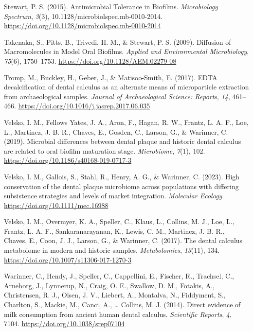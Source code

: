 \documentclass[
  letterpaper,
]{book}
\newlength{\cslhangindent}
\newlength{\cslentryspacingunit} %
\newenvironment{CSLReferences}[2] %
 {%
  \setlength{\parindent}{0pt}
  \ifodd #1
  \let\oldpar\par
  \def\par{\hangindent=\cslhangindent\oldpar}
  \fi
  \setlength{\parskip}{#2\cslentryspacingunit}
 }%
 {}
\begin{document}
\begin{CSLReferences}{1}{0}
\leavevmode{}%
Stewart, P. S. (2015). Antimicrobial {Tolerance} in {Biofilms}.
\emph{Microbiology Spectrum}, \emph{3}(3),
10.1128/microbiolspec.mb-0010-2014.
\url{https://doi.org/10.1128/microbiolspec.mb-0010-2014}

\leavevmode{}%
Takenaka, S., Pitts, B., Trivedi, H. M., \& Stewart, P. S. (2009).
Diffusion of {Macromolecules} in {Model Oral Biofilms}. \emph{Applied
and Environmental Microbiology}, \emph{75}(6), 1750--1753.
\url{https://doi.org/10.1128/AEM.02279-08}

\leavevmode{}%
Tromp, M., Buckley, H., Geber, J., \& Matisoo-Smith, E. (2017). {EDTA}
decalcification of dental calculus as an alternate means of
microparticle extraction from archaeological samples. \emph{Journal of
Archaeological Science: Reports}, \emph{14}, 461--466.
\url{https://doi.org/10.1016/j.jasrep.2017.06.035}

\leavevmode{}%
Velsko, I. M., Fellows Yates, J. A., Aron, F., Hagan, R. W., Frantz, L.
A. F., Loe, L., Martinez, J. B. R., Chaves, E., Gosden, C., Larson, G.,
\& Warinner, C. (2019). Microbial differences between dental plaque and
historic dental calculus are related to oral biofilm maturation stage.
\emph{Microbiome}, \emph{7}(1), 102.
\url{https://doi.org/10.1186/s40168-019-0717-3}

\leavevmode{}%
Velsko, I. M., Gallois, S., Stahl, R., Henry, A. G., \& Warinner, C.
(2023). High conservation of the dental plaque microbiome across
populations with differing subsistence strategies and levels of market
integration. \emph{Molecular Ecology}.
\url{https://doi.org/10.1111/mec.16988}

\leavevmode{}%
Velsko, I. M., Overmyer, K. A., Speller, C., Klaus, L., Collins, M. J.,
Loe, L., Frantz, L. A. F., Sankaranarayanan, K., Lewis, C. M., Martinez,
J. B. R., Chaves, E., Coon, J. J., Larson, G., \& Warinner, C. (2017).
The dental calculus metabolome in modern and historic samples.
\emph{Metabolomics}, \emph{13}(11), 134.
\url{https://doi.org/10.1007/s11306-017-1270-3}

\leavevmode{}%
Warinner, C., Hendy, J., Speller, C., Cappellini, E., Fischer, R.,
Trachsel, C., Arneborg, J., Lynnerup, N., Craig, O. E., Swallow, D. M.,
Fotakis, A., Christensen, R. J., Olsen, J. V., Liebert, A., Montalva,
N., Fiddyment, S., Charlton, S., Mackie, M., Canci, A., \ldots{}
Collins, M. J. (2014). Direct evidence of milk consumption from ancient
human dental calculus. \emph{Scientific Reports}, \emph{4}, 7104.
\url{https://doi.org/10.1038/srep07104}


\end{CSLReferences}
\end{document}
